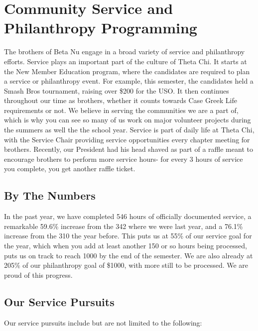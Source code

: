 \chapter{Community Service and Philanthropy Programming}

  The brothers of Beta Nu engage in a broad variety of service and philanthropy efforts. Service plays an important part of the culture of Theta Chi. It starts at the New Member Education program, where the candidates are required to plan a service or philanthropy event. For example, this semester, the candidates held a Smash Bros tournament, raising over \$200 for the USO. It then continues throughout our time as brothers, whether it counts towards Case Greek Life requirements or not. We believe in serving the communities we are a part of, which is why you can see so many of us work on major volunteer projects during the summers as well the the school year. Service is part of daily life at Theta Chi, with the Service Chair providing service opportunities every chapter meeting for brothers. Recently, our President had his head shaved as part of a raffle meant to encourage brothers to perform more service hours- for every 3 hours of service you complete, you get another raffle ticket.
  
  \section*{By The Numbers}
  In the past year, we have completed 546 hours of officially documented service, a remarkable  59.6\% increase from the 342 where we were last year, and a 76.1\% increase from the 310 the year before. This puts us at 55\% of our service goal for the year, which when you add at least another 150 or so hours being processed, puts us on track to reach 1000 by the end of the semester. We are also already at 205\% of our philanthropy goal of \$1000, with more still to be processed. We are proud of this progress.
  
  \section*{Our Service Pursuits}
   Our service pursuits include but are not limited to the following:
      
